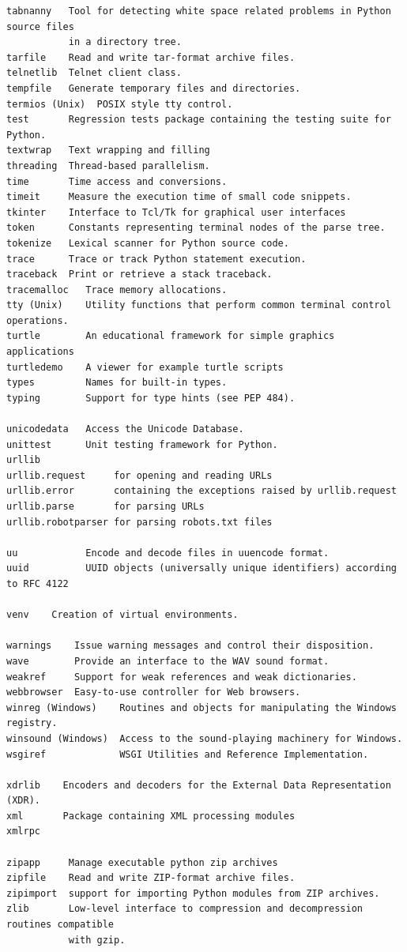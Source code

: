 \documentclass[9pt,a4wide]{extarticle}
\begin{document}
\begin{verbatim}
tabnanny   Tool for detecting white space related problems in Python source files 
           in a directory tree.
tarfile    Read and write tar-format archive files.
telnetlib  Telnet client class.
tempfile   Generate temporary files and directories.
termios (Unix)  POSIX style tty control.
test       Regression tests package containing the testing suite for Python.
textwrap   Text wrapping and filling
threading  Thread-based parallelism.
time       Time access and conversions.
timeit     Measure the execution time of small code snippets.
tkinter    Interface to Tcl/Tk for graphical user interfaces
token      Constants representing terminal nodes of the parse tree.
tokenize   Lexical scanner for Python source code.
trace      Trace or track Python statement execution.
traceback  Print or retrieve a stack traceback.
tracemalloc   Trace memory allocations.
tty (Unix)    Utility functions that perform common terminal control operations.
turtle        An educational framework for simple graphics applications
turtledemo    A viewer for example turtle scripts
types         Names for built-in types.
typing        Support for type hints (see PEP 484).

unicodedata   Access the Unicode Database.
unittest      Unit testing framework for Python.
urllib
urllib.request     for opening and reading URLs
urllib.error       containing the exceptions raised by urllib.request
urllib.parse       for parsing URLs
urllib.robotparser for parsing robots.txt files

uu            Encode and decode files in uuencode format.
uuid          UUID objects (universally unique identifiers) according to RFC 4122

venv    Creation of virtual environments.

warnings    Issue warning messages and control their disposition.
wave        Provide an interface to the WAV sound format.
weakref     Support for weak references and weak dictionaries.
webbrowser  Easy-to-use controller for Web browsers.
winreg (Windows)    Routines and objects for manipulating the Windows registry.
winsound (Windows)  Access to the sound-playing machinery for Windows.
wsgiref             WSGI Utilities and Reference Implementation.

xdrlib    Encoders and decoders for the External Data Representation (XDR).
xml       Package containing XML processing modules
xmlrpc

zipapp     Manage executable python zip archives
zipfile    Read and write ZIP-format archive files.
zipimport  support for importing Python modules from ZIP archives.
zlib       Low-level interface to compression and decompression routines compatible 
           with gzip.	 
\end{verbatim}
\end{document}
